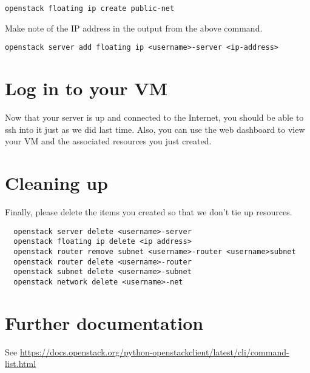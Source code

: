 \documentclass{article}
\begin{document}
  \texttt{openstack floating ip create public-net}
  
Make note of the IP address in the output from the above command.

 \texttt{openstack server add floating ip <username>-server <ip-address>}


\section{Log in to your VM}
Now that your server is up and connected to the Internet, you should be able to ssh into it just as we did last time. Also, you can use the web dashboard to view your VM and the associated resources you just created.

\section{Cleaning up}
Finally, please delete the items you created so that we don't tie up resources.

\begin{verbatim}
  openstack server delete <username>-server
  openstack floating ip delete <ip address>
  openstack router remove subnet <username>-router <username>subnet
  openstack router delete <username>-router
  openstack subnet delete <username>-subnet
  openstack network delete <username>-net
\end{verbatim}

\section{Further documentation}
 
 See \url{https://docs.openstack.org/python-openstackclient/latest/cli/command-list.html}
 
 
\end{document}
